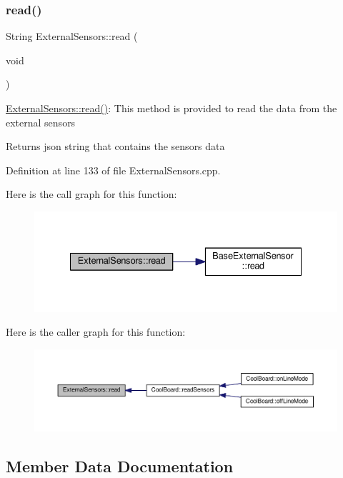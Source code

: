 \subsubsection{\texorpdfstring{read()}{read()}}
{\footnotesize\ttfamily String External\+Sensors\+::read (\begin{DoxyParamCaption}\item[{void}]{ }\end{DoxyParamCaption})}

\hyperlink{class_external_sensors_a53177b81eca3be89508b5511ddcd00fc}{External\+Sensors\+::read()}\+: This method is provided to read the data from the external sensors

\begin{DoxyReturn}{Returns}
json string that contains the sensors data 
\end{DoxyReturn}


Definition at line 133 of file External\+Sensors.\+cpp.

Here is the call graph for this function\+:
\nopagebreak
\begin{figure}[H]
\begin{center}
\leavevmode
\includegraphics[width=335pt]{class_external_sensors_a53177b81eca3be89508b5511ddcd00fc_cgraph}
\end{center}
\end{figure}
Here is the caller graph for this function\+:
\nopagebreak
\begin{figure}[H]
\begin{center}
\leavevmode
\includegraphics[width=350pt]{class_external_sensors_a53177b81eca3be89508b5511ddcd00fc_icgraph}
\end{center}
\end{figure}


\subsection{Member Data Documentation}
\mbox{\label{class_external_sensors_a284233f884fcf00154a44740cf1d9e1e}} 
